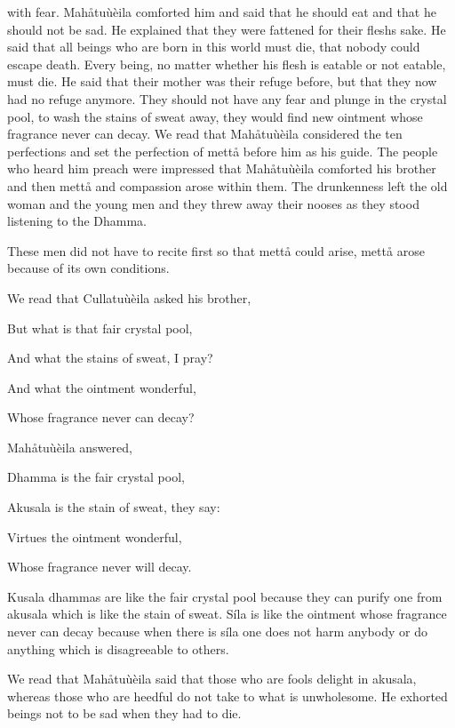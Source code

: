 \documentclass[12pt,twoside]{article}
\begin{document}
with fear. Mah{\aa}tu\`u\`eila comforted him and said that he should
eat and that he should not be sad. He explained that they were fattened
for their flesh{\textquotesingle}s sake. He said that all beings who
are born in this world must die, that nobody could escape death. Every
being, no matter whether his flesh is eatable or not eatable, must die.
He said that their mother was their refuge before, but that they now
had no refuge anymore. They should not have any fear and plunge in the
crystal pool, to wash the stains of sweat away, they would find new
ointment whose fragrance never can decay. We read that
Mah{\aa}tu\`u\`eila considered the ten perfections and set the
perfection of mett{\aa} before him as his guide. The people who heard
him preach were impressed that Mah{\aa}tu\`u\`eila comforted his
brother and then mett{\aa} and compassion arose within them. The
drunkenness left the old woman and the young men and they threw away
their nooses as they stood listening to the Dhamma. 

These men did not have to recite first so that mett{\aa} could arise,
mett{\aa} arose because of its own conditions. 

We read that Cullatu\`u\`eila asked his brother,


\bigskip

But what is that fair crystal pool,

And what the stains of sweat, I pray?

And what the ointment wonderful,

Whose fragrance never can decay?


\bigskip

Mah{\aa}tu\`u\`eila answered,


\bigskip

Dhamma is the fair crystal pool,

Akusala is the stain of sweat, they say:

Virtue{\textquotesingle}s the ointment wonderful,

Whose fragrance never will decay.


\bigskip

Kusala dhammas are like the fair crystal pool because they can purify
one from akusala which is like the stain of sweat. S\'ila is like the
ointment whose fragrance never can decay because when there is s\'ila
one does not harm anybody or do anything which is disagreeable to
others. 

We read that Mah{\aa}tu\`u\`eila said that those who are fools delight
in akusala, whereas those who are heedful do not take to what is
unwholesome. He exhorted beings not to be sad when they had to die. 
\end{document}

